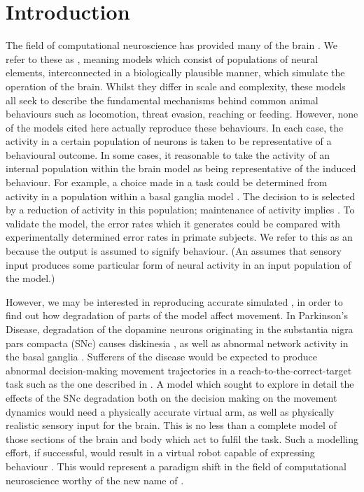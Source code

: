 \documentclass{frontiersSCNS}
\begin{document}
\section{Introduction}

The field of computational neuroscience has provided many  of the
brain \citep{arai_two-dimensional_1994,gancarz_neural_1998,hazy_towards_2007,blenkinsop_frequency_2017}.
We refer to these as , meaning
models which consist of populations of neural elements, interconnected
in a biologically plausible manner, which simulate the operation of
the brain. Whilst they differ in scale and complexity, these models
all seek to describe the fundamental mechanisms behind common animal
behaviours such as locomotion, threat evasion, reaching or
feeding. However, none of the models cited here actually reproduce
these behaviours. In each case, the activity in a certain population
of neurons is taken to be representative of a behavioural outcome.
In some cases, it  reasonable to take the activity of an
internal population within the brain model as being representative of
the induced behaviour. For example, a choice made in a 
task could be determined from activity in a population within a basal
ganglia model
\citep{nambu_discharge_1990,kuhn_event-related_2004}. The decision
to  is selected by a reduction of activity in this population;
maintenance of activity implies . To validate the model, the
error rates which it generates could be compared with experimentally
determined error rates in primate subjects. We refer to this as
an  because the output is assumed to
signify behaviour. (An  assumes that sensory
input produces some particular form of neural activity in an input
population of the model.)

However, we may be interested in reproducing accurate
simulated , in order to find out how degradation of
parts of the model affect movement. In Parkinson's Disease,
degradation of the dopamine neurons originating in the substantia
nigra pars compacta (SNc) causes
diskinesia \citep{galvan_pathophysiology_2008}, as well as abnormal
network activity in the basal
ganglia \citep{brown_dopamine_2001,mccarthy_striatal_2011}.  Sufferers
of the disease would be expected to produce abnormal
decision-making  movement trajectories in a
reach-to-the-correct-target task such as the one described in
\cite{james_target-distractor_2017}.
%
A model which sought to explore in detail the effects of the SNc
degradation both on the decision making  on the movement
dynamics would need a physically accurate virtual arm, as well as
physically realistic sensory input for the brain. This is no less than
a complete model of those sections of the brain and body which act to
fulfil the task. Such a modelling effort, if successful, would result
in a virtual robot capable of expressing behaviour . This would represent a paradigm
shift in the field of computational neuroscience worthy of the new
name of .
\end{document}

